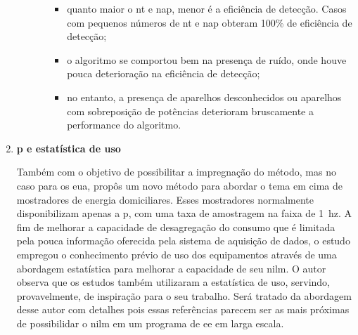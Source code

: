 \begin{enumerate}[label=\textbf{1.\arabic*},wide=\parindent]
\begin{enumerate}[label*=.\textbf{\arabic*},wide=\parindent]
\begin{itemize}[wide=\parindent]
\begin{itemize}
\item quanto maior o \gls{nt} e \gls{nap}, menor é a eficiência de
detecção. Casos com pequenos números de \gls{nt} e \gls{nap} obteram
100\% de eficiência de detecção;
\item o algoritmo se comportou bem na presença de ruído, onde houve
pouca deterioração na eficiência de detecção;
\item no entanto, a presença de aparelhos desconhecidos ou aparelhos
com sobreposição de potências deterioram bruscamente a performance do
algoritmo.
\end{itemize}

\end{itemize}

\end{enumerate}

\item \textbf{\Acrlong{p} e estatística de uso}
\label{top:nilm_p_estatistica}

Também com o objetivo de possibilitar a impregnação do método, mas no
caso para os \gls{eua},
\citeauthor*{nilm_zeifman_vastext_approach_2012} propôs um novo método
\cite{nilm_zeifman_vast_2011,
nilm_zeifman_vast_hisample_pdfmerge_2011,
nilm_zeifman_vastext_approach_2012,
nilm_zeifman_statistical_vastext_1stws_2012,
nilm_zeifman_statistical_naive_enduses_2013} para abordar o tema em
cima de mostradores de energia domiciliares. Esses mostradores
normalmente disponibilizam apenas a \acl{p}, com uma taxa de
amostragem na faixa de 1~\acs{hz}. A fim de melhorar a capacidade
de desagregação do consumo que é limitada pela pouca informação
oferecida pela sistema de aquisição de dados, o estudo empregou o
conhecimento prévio de uso dos equipamentos através de uma abordagem
estatística para melhorar a capacidade de seu \gls{nilm}. O autor
observa que os estudos \cite{nilm_farinaccio_16ssamp_1999_17,
nilm_marceau_16ssamp_improved_1999_18} também utilizaram a estatística
de uso, servindo, provavelmente, de inspiração para o seu trabalho.
Será tratado da abordagem desse autor com detalhes pois essas
referências parecem ser as mais próximas de possibilidar o \gls{nilm}
em um programa de \gls{ee} em larga escala.


\end{enumerate}
